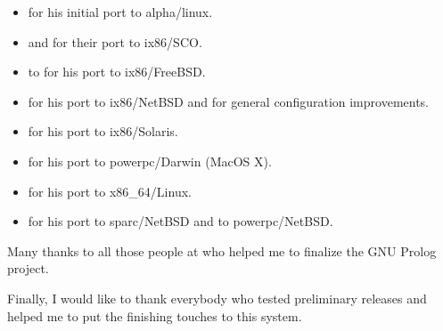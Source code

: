 \begin{itemize}

\item {} for his initial port to
alpha/linux.

\item {} and
 for their port to 
ix86/SCO.

\item {} to for his port to
ix86/FreeBSD.

\item {} for his port to
ix86/NetBSD and for general configuration improvements.

\item {} for
his port to ix86/Solaris.

\item {} for his port to 
powerpc/Darwin (MacOS X).

\item {} for his port to
x86\_64/Linux.

\item {} for his port to
sparc/NetBSD and to powerpc/NetBSD.

\end{itemize}

Many thanks to all those people at  who helped
me to finalize the GNU Prolog project.

Finally, I would like to thank everybody who tested preliminary releases and
helped me to put the finishing touches to this system.
